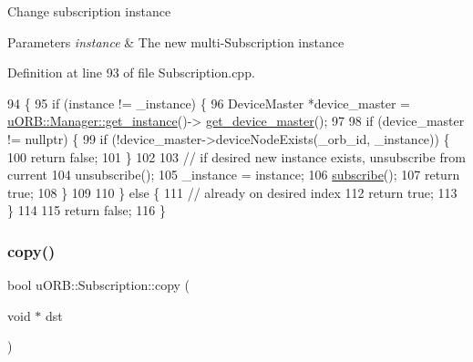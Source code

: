 Change subscription instance 
\begin{DoxyParams}{Parameters}
{\em instance} & The new multi-\/\+Subscription instance \\
\hline
\end{DoxyParams}


Definition at line 93 of file Subscription.\+cpp.


\begin{DoxyCode}
94 \{
95     \textcolor{keywordflow}{if} (instance != \_instance) \{
96         DeviceMaster *device\_master = \hyperlink{classuORB_1_1Manager_a9d829b3ea49d16d03c2fa37ef2bb24a5}{uORB::Manager::get\_instance}()->
      \hyperlink{classuORB_1_1Manager_a083331e24ac4f99ac11a0aab1b1681b4}{get\_device\_master}();
97 
98         \textcolor{keywordflow}{if} (device\_master != \textcolor{keyword}{nullptr}) \{
99             \textcolor{keywordflow}{if} (!device\_master->deviceNodeExists(\_orb\_id, \_instance)) \{
100                 \textcolor{keywordflow}{return} \textcolor{keyword}{false};
101             \}
102 
103             \textcolor{comment}{// if desired new instance exists, unsubscribe from current}
104             unsubscribe();
105             \_instance = instance;
106             \hyperlink{classuORB_1_1Subscription_acb0fbd4b56d5e3c8edca15206e110223}{subscribe}();
107             \textcolor{keywordflow}{return} \textcolor{keyword}{true};
108         \}
109 
110     \} \textcolor{keywordflow}{else} \{
111         \textcolor{comment}{// already on desired index}
112         \textcolor{keywordflow}{return} \textcolor{keyword}{true};
113     \}
114 
115     \textcolor{keywordflow}{return} \textcolor{keyword}{false};
116 \}
\end{DoxyCode}
\mbox{\label{classuORB_1_1Subscription_a17a37eb5624b409379db434400de4582}} 
\subsubsection{\texorpdfstring{copy()}{copy()}}
{\footnotesize\ttfamily bool u\+O\+R\+B\+::\+Subscription\+::copy (\begin{DoxyParamCaption}\item[{void $\ast$}]{dst }\end{DoxyParamCaption})\hspace{0.3cm}{\ttfamily [inline]}}

